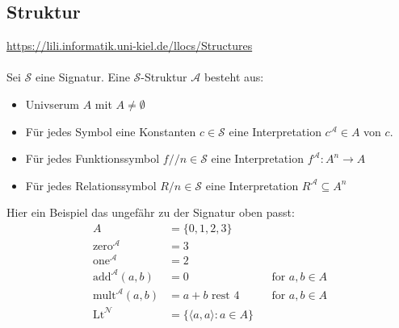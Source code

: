 \documentclass{article}
\begin{document}
    \subsection{Struktur}
    \url{https://lili.informatik.uni-kiel.de/llocs/Structures}\\\\
    Sei $\mathcal S$ eine Signatur. Eine $\mathcal S$-Struktur $\mathcal A$ besteht aus:
    \begin{itemize}
        \item Univserum $A$ mit $A \not= \emptyset$
        \item Für jedes Symbol eine Konstanten $c \in \mathcal{S}$ eine Interpretation $c^\mathcal A \in A$ von $c$.
        \item Für jedes Funktionssymbol $f/\!/n \in \mathcal S$ eine Interpretation $f^\mathcal A \colon A^n \to A$
        \item Für jedes Relationssymbol $R/n \in \mathcal S$ eine Interpretation $R^\mathcal A \subseteq A^n$
    \end{itemize}
    Hier ein Beispiel das ungefähr zu der Signatur oben passt:\\
    \begin{align*}
        A & = \{0, 1, 2, 3\} \\
        \text{zero}^\mathcal A & = 3\\
        \text{one}^\mathcal A & = 2\\
        \text{add}^\mathcal A(a,b) & = 0 && \text{for $a, b \in A$}\\
        \text{mult}^\mathcal A(a,b) & = a + b \text{ rest } 4 && \text{for $a, b \in A$}\\
        \text{Lt}^\mathcal N & = \{\langle a, a\rangle \colon a \in A\}
    \end{align*}
\end{document}
